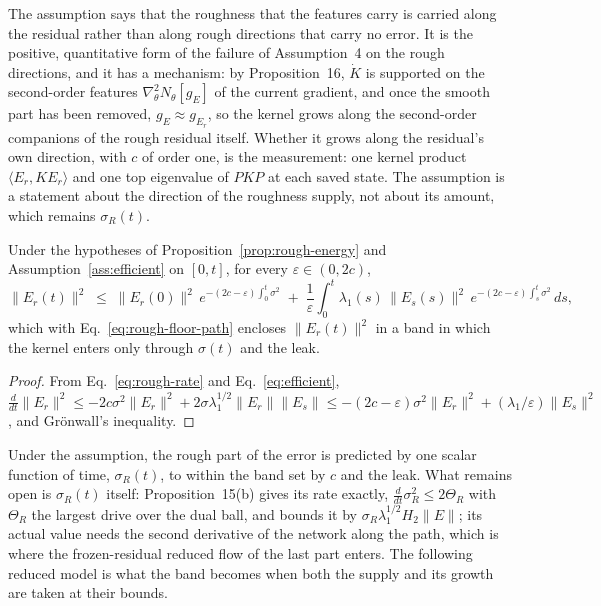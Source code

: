The assumption says that the roughness that the features carry is carried
along the residual rather than along rough directions that carry no error. It
is the positive, quantitative form of the failure of Assumption~4 on the rough
directions, and it has a mechanism: by Proposition~16, $\dot K$ is supported
on the second-order features $\nabla^2_\theta N_\theta[g_E]$ of the current
gradient, and once the smooth part has been removed, $g_E\approx g_{E_r}$, so
the kernel grows along the second-order companions of the rough residual
itself. Whether it grows along the residual's own direction, with $c$ of order
one, is the measurement: one kernel product $\langle E_r,KE_r\rangle$ and one
top eigenvalue of $PKP$ at each saved state. The assumption is a statement
about the direction of the roughness supply, not about its amount, which
remains $\sigma_R(t)$.

\begin{proposition}
\label{prop:two-sided}
Under the hypotheses of Proposition~\ref{prop:rough-energy} and
Assumption~\ref{ass:efficient} on $[0,t]$, for every $\varepsilon\in(0,2c)$,
\begin{equation}
\|E_r(t)\|^2 \;\le\; \|E_r(0)\|^2\,e^{-(2c-\varepsilon)\int_0^t\sigma^2}
\;+\;\frac1\varepsilon\int_0^t\lambda_1(s)\,\|E_s(s)\|^2\,e^{-(2c-\varepsilon)\int_s^t\sigma^2}\,ds,
\label{eq:rough-upper}
\end{equation}
which with Eq.~\eqref{eq:rough-floor-path} encloses $\|E_r(t)\|^2$ in a band
in which the kernel enters only through $\sigma(t)$ and the leak.
\end{proposition}

\begin{proof}
From Eq.~\eqref{eq:rough-rate} and Eq.~\eqref{eq:efficient},
$\frac{d}{dt}\|E_r\|^2\le -2c\sigma^2\|E_r\|^2+2\sigma\lambda_1^{1/2}\|E_r\|\|E_s\|
\le -(2c-\varepsilon)\sigma^2\|E_r\|^2+(\lambda_1/\varepsilon)\|E_s\|^2$,
and Gr\"onwall's inequality.
\end{proof}

Under the assumption, the rough part of the error is predicted by one scalar
function of time, $\sigma_R(t)$, to within the band set by $c$ and the leak.
What remains open is $\sigma_R(t)$ itself: Proposition~15(b) gives its rate
exactly, $\frac{d}{dt}\sigma_R^2\le2\Theta_R$ with $\Theta_R$ the largest drive
over the dual ball, and bounds it by $\sigma_R\lambda_1^{1/2}H_2\|E\|$; its
actual value needs the second derivative of the network along the path, which
is where the frozen-residual reduced flow of the last part enters. The
following reduced model is what the band becomes when both the supply and its
growth are taken at their bounds.

